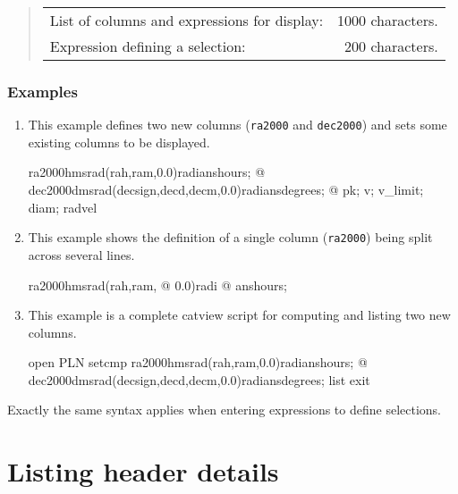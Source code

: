 \documentclass[twoside,11pt]{starlink}
\begin{document}
\begin{quote}
\begin{tabular}{lr}
List of columns and expressions for display: &  1000 characters. \\
Expression defining a selection:             &   200 characters. \\
\end{tabular}
\end{quote}

\subsubsection{Examples}

\begin{enumerate}

  \item This example defines two new columns (\texttt{ra2000} and \texttt{dec2000}) and sets some existing columns to be displayed.

  \begin{terminalv}
ra2000{hmsrad(rah,ram,0.0)}radians{hours}; @
dec2000{dmsrad(decsign,decd,decm,0.0)}radians{degrees}; @
pk; v; v_limit; diam; radvel
  \end{terminalv}

  \item This example shows the definition of a single column (\texttt{ra2000}) being split across several lines.

  \begin{terminalv}
ra2000{hmsrad(rah,ram,  @
0.0)}radi  @
ans{hours};
  \end{terminalv}

  \item This example is a complete catview script for computing and
   listing two new columns.

  \begin{terminalv}
open
PLN
setcmp
ra2000{hmsrad(rah,ram,0.0)}radians{hours}; @
dec2000{dmsrad(decsign,decd,decm,0.0)}radians{degrees};
list
exit
  \end{terminalv}

\end{enumerate}

Exactly the same syntax applies when entering expressions to define
selections.


\section{\label{HEAD}Listing header details}
\end{document}
